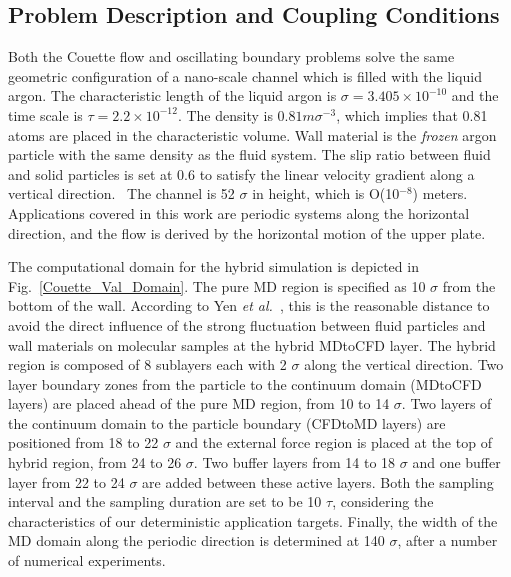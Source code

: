\documentclass[preprint,12pt]{elsarticle}
\begin{document}
\subsection{Problem Description and Coupling Conditions}
\label{sec:accuracy_conditions}

Both the Couette flow and oscillating boundary problems solve the same geometric configuration of a nano-scale channel which is filled with the liquid argon. The characteristic length of the liquid argon is ${\sigma}=3.405{\times}10^{-10}$ and the time scale is $\tau=2.2{\times}10^{-12}$. The density is $0.81m{\sigma}^{-3}$, which implies that 0.81 atoms are placed in the characteristic volume. Wall material is the \textit{frozen} argon particle with the same density as the fluid system. The slip ratio between fluid and solid particles is set at 0.6 to satisfy the linear velocity gradient along a vertical direction.~\cite{Nie} The channel is 52 $\sigma$ in height, which is O(10$^{-8}$) meters. Applications covered in this work are periodic systems along the horizontal direction, and the flow is derived by the horizontal motion of the upper plate.

The computational domain for the hybrid simulation is depicted in Fig.~\ref{Couette_Val_Domain}. The pure MD region is specified as 10 $\sigma$ from the bottom of the wall. According to Yen \textit{et al.}~\cite{Yen}, this is the reasonable distance to avoid the direct influence of the strong fluctuation between fluid particles and wall materials on molecular samples at the hybrid MDtoCFD layer.
The hybrid region is composed of 8 sublayers each with 2 $\sigma$ along the vertical direction. Two layer boundary zones from the particle to the continuum domain (MDtoCFD layers) are placed ahead of the pure MD region, from 10 to 14 $\sigma$. Two layers of the continuum domain to the particle boundary (CFDtoMD layers) are positioned from 18 to 22 $\sigma$ and the external force region is placed at the top of hybrid region, from 24 to 26 $\sigma$. Two buffer layers from 14 to 18 $\sigma$ and one buffer layer from 22 to 24 $\sigma$ are added between these active layers.
Both the sampling interval and the sampling duration are set to be 10 $\tau$, considering the characteristics of our deterministic application targets. Finally, the width of the MD domain along the periodic direction is determined at 140 $\sigma$, after a number of numerical experiments.
\end{document}
